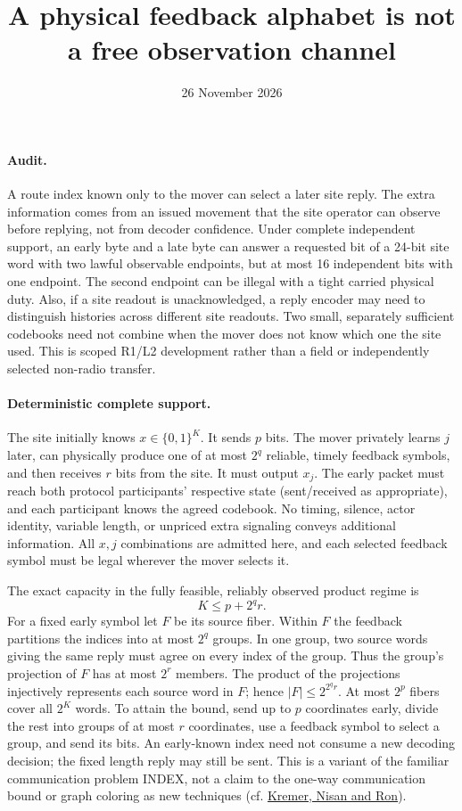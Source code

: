 \documentclass[11pt]{article}
\begin{document}
\title{A physical feedback alphabet is not a free observation channel}
\author{}
\date{26 November 2026}
\maketitle

\paragraph{Audit.}
A route index known only to the mover can select a later
site reply. The extra information comes from an issued
movement that the site operator can observe before replying,
not from decoder confidence. Under complete independent
support, an early byte and a late byte can answer a requested
bit of a 24-bit site word with two lawful observable endpoints,
but at most 16 independent bits with one endpoint. The second
endpoint can be illegal with a tight carried physical duty.
Also, if a site readout is unacknowledged, a reply encoder
may need to distinguish histories across different site readouts.
Two small, separately sufficient codebooks need not combine
when the mover does not know which one the site used.
This is scoped R1/L2 development rather than a field or
independently selected non-radio transfer.

\paragraph{Deterministic complete support.}
The site initially knows $x\in\{0,1\}^K$. It sends $p$ bits.
The mover privately learns $j$ later, can physically produce
one of at most $2^q$ reliable, timely feedback symbols, and
then receives $r$ bits from the site. It must output $x_j$.
The early packet must reach both protocol participants'
respective state (sent/received as appropriate), and each
participant knows the agreed codebook. No timing, silence,
actor identity, variable length, or unpriced extra signaling
conveys additional information. All $x,j$ combinations are
admitted here, and each selected feedback symbol must be
legal wherever the mover selects it.

The exact capacity in the fully feasible, reliably observed
product regime is
\[
                  K\leq p+2^q r .
\]
For a fixed early symbol let $F$ be its source fiber. Within $F$
the feedback partitions the indices into at most $2^q$ groups.
In one group, two source words giving the same reply must agree
on every index of the group. Thus the group's projection of
$F$ has at most $2^r$ members. The product of the projections
injectively represents each source word in $F$; hence
$|F|\leq2^{2^q r}$. At most $2^p$ fibers cover all $2^K$
words. To attain the bound, send up to $p$ coordinates early,
divide the rest into groups of at most $r$ coordinates,
use a feedback symbol to select a group, and send its bits.
An early-known index need not consume a new decoding decision;
the fixed length reply may still be sent. This is a variant
of the familiar communication problem INDEX, not a claim
to the one-way communication bound or graph coloring as
new techniques (cf. \href{https://cris.tau.ac.il/en/publications/on-randomized-one-round-communication-complexity/}{Kremer, Nisan and Ron}).
\end{document}

